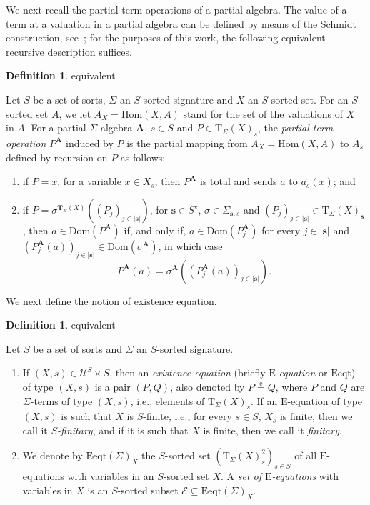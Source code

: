 \documentclass[a4paper, reqno]{amsbook}
\makeatletter
\newcommand{\bb}[1]{\ensuremath{\lvert #1 \rvert}}
\newcommand{\eeq}{\overset{\mathrm e}{=}}      %
\newcommand{\Dom}{\mathrm{Dom}}
\theoremstyle{plain}
\theoremstyle{definition}
\newtheorem{definition}[theorem]{Definition}
\newcommand*{\CA@leanpending}{}
\newcommand*{\CA@leanrelation}{}
\newcommand*{\lean}[2]{%
  \ifcsname\string\color@lean@#1\endcsname\else
    \PackageError{main}{Unknown relation `#1' in \string\lean}{Use equivalent, weaker or stronger.}%
  \fi
  \gdef\CA@leanrelation{#1}%
  \gdef\CA@leanpending{#2}}
\makeatother
\begin{document}
We next recall the partial term operations of a partial algebra.
The value of a term at a valuation in a partial algebra can be defined by means of the Schmidt construction, see~\cite{Schmidt1970, ClimentCosme2023}; for the purposes of this work, the following equivalent recursive description suffices.

\begin{definition}\label{DTermOp}\lean{equivalent}{Term.partialEval}
Let $S$ be a set of sorts, $\Sigma$ an $S$-sorted signature and $X$ an $S$-sorted set.
For an $S$-sorted set $A$, we let $A_{X}=\mathrm{Hom}(X,A)$ stand for the set of the valuations of $X$ in $A$.
For a partial $\Sigma$-algebra $\mathbf{A}$, $s\in S$ and $P\in\mathrm{T}_{\Sigma}(X)_{s}$, the \emph{partial term operation} $P^{\mathbf{A}}$ induced by $P$ is the partial mapping from $A_{X}=\mathrm{Hom}(X,A)$ to $A_{s}$ defined by recursion on $P$ as follows:
\begin{enumerate}
\item if $P=x$, for a variable $x\in X_{s}$, then $P^{\mathbf{A}}$ is total and sends $a$ to $a_{s}(x)$; and
\item if $P=\sigma^{\mathbf{T}_{\Sigma}(X)}((P_{j})_{j\in\bb{\mathbf{s}}})$, for $\mathbf{s}\in S^{\star}$, $\sigma\in\Sigma_{\mathbf{s},s}$ and $(P_{j})_{j\in\bb{\mathbf{s}}}\in\mathrm{T}_{\Sigma}(X)_{\mathbf{s}}$, then $a\in\Dom(P^{\mathbf{A}})$ if, and only if, $a\in\Dom(P_{j}^{\mathbf{A}})$ for every $j\in\bb{\mathbf{s}}$ and $(P_{j}^{\mathbf{A}}(a))_{j\in\bb{\mathbf{s}}}\in\Dom(\sigma^{\mathbf{A}})$, in which case
$$
P^{\mathbf{A}}(a)=\sigma^{\mathbf{A}}\left((P_{j}^{\mathbf{A}}(a))_{j\in\bb{\mathbf{s}}}\right).
$$
\end{enumerate}
\end{definition}

We next define the notion of existence equation.

\begin{definition}\label{DExistenceEq}\lean{equivalent}{EEquation}
Let $S$ be a set of sorts and $\Sigma$ an $S$-sorted signature.
\begin{enumerate}
\item If $(X,s)\in\boldsymbol{\mathcal{U}}^{S}\times S$, then an \emph{existence equation} (briefly $\mathrm{E}$-\emph{equation} or $\mathrm{Eeqt}$) of type $(X,s)$ is a pair $(P,Q)$, also denoted by $P\eeq Q$, where $P$ and $Q$ are $\Sigma$-terms of type $(X,s)$, i.e., elements of $\mathrm{T}_{\Sigma}(X)_{s}$.
If an $\mathrm{E}$-equation of type $(X,s)$ is such that $X$ is $S$-finite, i.e., for every $s\in S$, $X_{s}$ is finite, then we call it $S$\emph{-finitary}, and if it is such that $X$ is finite, then we call it \emph{finitary}.
\item We denote by $\mathrm{Eeqt}(\Sigma)_{X}$ the $S$-sorted set $(\mathrm{T}_{\Sigma}(X)_{s}^{2})_{s\in S}$ of all $\mathrm{E}$-equations with variables in an $S$-sorted set $X$.
A \emph{set of $\mathrm{E}$-equations} with variables in $X$ is an $S$-sorted subset $\mathcal{E}\subseteq\mathrm{Eeqt}(\Sigma)_{X}$.
\end{enumerate}
\end{definition}
\end{document}

